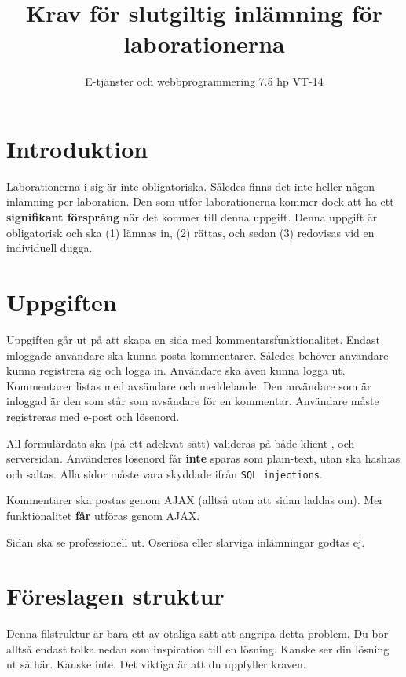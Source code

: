 \documentclass[12pt]{article}
\date{}
\title{ Krav för slutgiltig inlämning för laborationerna }
\author{ E-tjänster och webbprogrammering 7.5 hp VT-14 }
\begin{document}
\maketitle
\vspace{-2em}



\section{Introduktion}
Laborationerna i sig är inte obligatoriska. Således finns det inte heller någon inlämning per laboration. Den som utför laborationerna kommer dock att ha ett \textbf{signifikant försprång} när det kommer till denna uppgift. Denna uppgift är obligatorisk och ska (1) lämnas in, (2) rättas, och sedan (3) redovisas vid en individuell dugga.

\section{Uppgiften}
Uppgiften går ut på att skapa en sida med kommentarsfunktionalitet. Endast inloggade användare ska kunna posta kommentarer. Således behöver användare kunna registrera sig och logga in. Användare ska även kunna logga ut. Kommentarer listas med avsändare och meddelande. Den användare som är inloggad är den som står som avsändare för en kommentar. Användare måste registreras med e-post och lösenord.

All formulärdata ska (på ett adekvat sätt) valideras på både klient-, och serversidan. Använderes lösenord får \textbf{inte} sparas som plain-text, utan ska hash:as och saltas. Alla sidor måste vara skyddade ifrån \texttt{SQL injections}.

Kommentarer ska postas genom AJAX (alltså utan att sidan laddas om). Mer funktionalitet \textbf{får} utföras genom AJAX.

Sidan ska se professionell ut. Oseriösa eller slarviga inlämningar godtas ej.







\pagebreak
\section{Föreslagen struktur}
Denna filstruktur är bara ett av otaliga sätt att angripa detta problem. Du bör alltså endast tolka nedan som inspiration till en lösning. Kanske ser din lösning ut så här. Kanske inte. Det viktiga är att du uppfyller kraven.
\end{document}
